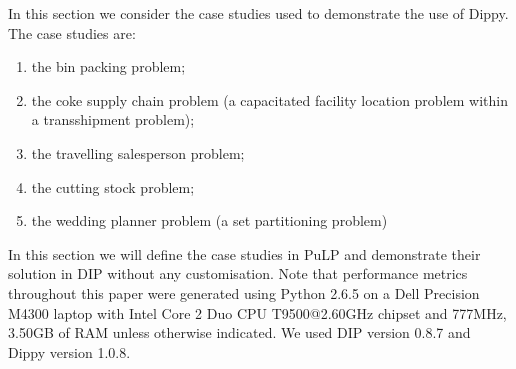 In this section we consider the case studies used to demonstrate the use of Dippy. The case studies are:
\begin{enumerate}
\item the bin packing problem;
\item the coke supply chain problem (a capacitated facility location problem within a transshipment problem);
\item the travelling salesperson problem;
\item the cutting stock problem;
\item the wedding planner problem (a set partitioning problem)
\end{enumerate}

In this section we will define the case studies in PuLP and demonstrate their solution in \ac{DIP} without any customisation.  Note that performance metrics throughout this paper were generated using Python 2.6.5 on a Dell Precision M4300 laptop with Intel Core 2 Duo CPU T9500@2.60GHz chipset and 777MHz, 3.50GB of RAM unless otherwise indicated. We used \ac{DIP} version 0.8.7 and Dippy version 1.0.8.









